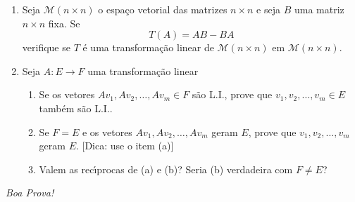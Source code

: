 \documentclass[a4paper,5pt]{amsbook}
\begin{document}
\begin{enumerate}
	\vspace{0.5cm}
	\item Seja $\mathcal{M}(n \times n)$ o espa\c{c}o vetorial das matrizes $n
		\times n$ e seja $B$ uma matriz $n \times n$ fixa. Se
		\[T(A) = AB - BA\]
		verifique se $T$ \'e uma transforma\c{c}\~ao linear de $\mathcal{M}(n \times
		n)$ em $\mathcal{M}(n \times n)$.

	\vspace{0.5cm}
	\item Seja $A: E \rightarrow F$ uma transforma\c{c}\~ao linear
		\begin{enumerate}
			\item Se os vetores $Av_1, Av_2, \ldots, Av_m \in F$ s\~ao L.I.,
				prove que $v_1, v_2, \ldots, v_m \in E$ tamb\'em s\~ao L.I..
			\item Se $F = E$ e os vetores $Av_1, Av_2, \ldots, Av_m$ geram $E$,
				prove que $v_1, v_2, \ldots, v_m$ geram $E$. [Dica: use o item (a)]
			\item Valem as rec\'{\i}procas de (a) e (b)? Seria (b) verdadeira com $F
				\neq E$?
		\end{enumerate}
\end{enumerate}

\begin{flushright}
	\vspace{1cm}
	\textit{Boa Prova!}
\end{flushright}
\end{document}
